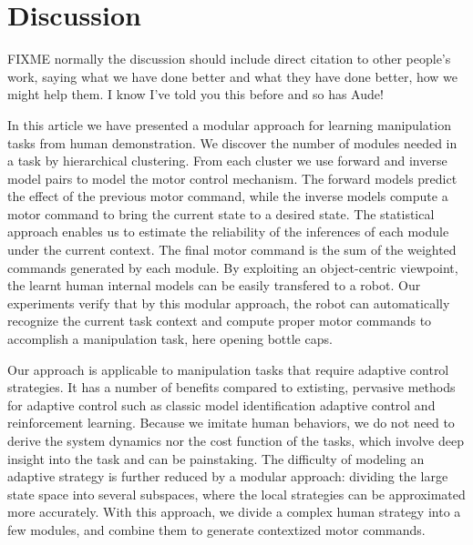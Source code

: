 \section{Discussion}
\label{sec:diss}

FIXME normally the discussion should include direct citation to other
people's work, saying what we have done better and what they have done
better, how we might help them.  I know I've told you this before and
so has Aude! %

In this article we have presented a modular approach for learning
manipulation tasks from human demonstration. We discover the number of
modules needed in a task by hierarchical clustering. From each cluster
we use forward and inverse model pairs to model the motor control
mechanism. The forward models predict the effect of the previous motor
command, while the inverse models compute a motor command to bring the
current state to a desired state. The statistical approach enables us
to estimate the reliability of the inferences of each module under the
current context. The final motor command is the sum of the weighted
commands generated by each module. By exploiting an object-centric
viewpoint, the learnt human internal models can be easily transfered
to a robot. Our experiments verify that by this modular approach, the
robot can automatically recognize the current task context and compute
proper motor commands to accomplish a manipulation task, here opening
bottle caps.


Our approach is applicable to manipulation tasks that require adaptive
control strategies. It has a number of benefits compared to extisting,
pervasive methods for adaptive control such as classic model
identification adaptive control and reinforcement
learning. %
Because we imitate human behaviors, we do not need to derive the
system dynamics nor the cost function of the tasks, which involve deep
insight into the task and can be painstaking. The difficulty of
modeling an adaptive strategy is further reduced by a modular
approach: dividing the large state space into several subspaces, where
the local strategies can be approximated more accurately. With this
approach, we divide a complex human strategy into a few modules, and
combine them to generate contextized motor commands.

